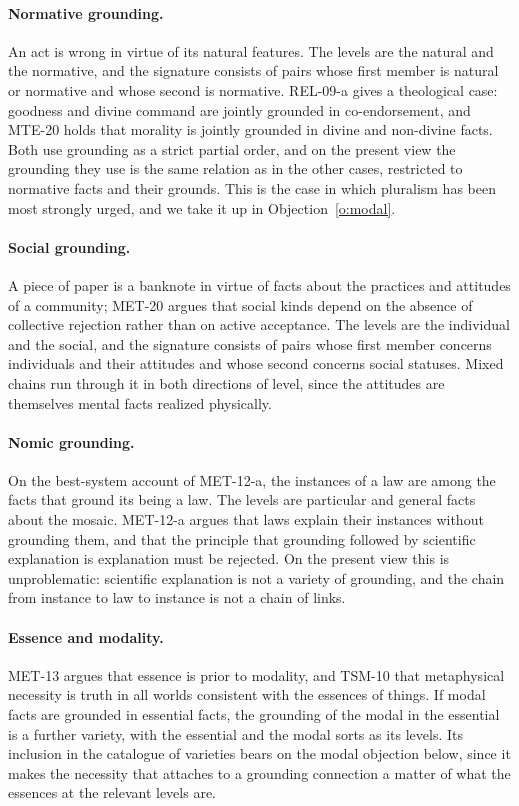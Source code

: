 \documentclass{situationist-preprint}
\begin{document}
\paragraph{Normative grounding.} An act is wrong in virtue of its natural features. The levels are the natural and the normative, and the signature consists of pairs whose first member is natural or normative and whose second is normative. REL-09-a gives a theological case: goodness and divine command are jointly grounded in co-endorsement, and MTE-20 holds that morality is jointly grounded in divine and non-divine facts. Both use grounding as a strict partial order, and on the present view the grounding they use is the same relation as in the other cases, restricted to normative facts and their grounds. This is the case in which pluralism has been most strongly urged, and we take it up in Objection~\ref{o:modal}.

\paragraph{Social grounding.} A piece of paper is a banknote in virtue of facts about the practices and attitudes of a community; MET-20 argues that social kinds depend on the absence of collective rejection rather than on active acceptance. The levels are the individual and the social, and the signature consists of pairs whose first member concerns individuals and their attitudes and whose second concerns social statuses. Mixed chains run through it in both directions of level, since the attitudes are themselves mental facts realized physically.

\paragraph{Nomic grounding.} On the best-system account of MET-12-a, the instances of a law are among the facts that ground its being a law. The levels are particular and general facts about the mosaic. MET-12-a argues that laws explain their instances without grounding them, and that the principle that grounding followed by scientific explanation is explanation must be rejected. On the present view this is unproblematic: scientific explanation is not a variety of grounding, and the chain from instance to law to instance is not a chain of links.

\paragraph{Essence and modality.} MET-13 argues that essence is prior to modality, and TSM-10 that metaphysical necessity is truth in all worlds consistent with the essences of things. If modal facts are grounded in essential facts, the grounding of the modal in the essential is a further variety, with the essential and the modal sorts as its levels. Its inclusion in the catalogue of varieties bears on the modal objection below, since it makes the necessity that attaches to a grounding connection a matter of what the essences at the relevant levels are.
\end{document}
